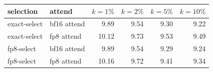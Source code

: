 \begin{tabular}{l l r r r r}
\toprule
selection & attend & $k{=}1\%$ & $k{=}2\%$ & $k{=}5\%$ & $k{=}10\%$ \\
\midrule
exact-select & bf16 attend & 9.89 & 9.54 & 9.30 & 9.22 \\
exact-select & fp8 attend & 10.12 & 9.73 & 9.53 & 9.49 \\
fp8-select & bf16 attend & 9.89 & 9.54 & 9.29 & 9.24 \\
fp8-select & fp8 attend & 10.16 & 9.72 & 9.41 & 9.34 \\
\bottomrule
\end{tabular}
